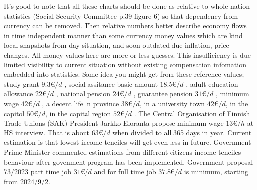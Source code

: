It's good to note that all these charts should be done
as relative to whole nation statistics
(Social Security Committee \cite{VN_2023_26} p.39 figure 6)
so that dependency from currency can be removed.
Then relative numbers better describe economy flows in time independent manner
than some currency money values which are kind local snapshots from day situation,
and soon outdated due inflation, price changes.
All money values here are more or less guesses.
This insufficiency is due limited visibility to current situation
without existing compensation infomation embedded into statistics.
Some idea you might get from these reference values;
study grant $9.3\euro/d$ \cite{KELA_StudyGrant},
social assitance basic amount $18.5\euro/d$ \cite{KELA_BASIC_ASSISTANCE},
adult education allowance $22\euro/d$ \cite{AdultEducationAllowance},
national pension $24\euro/d$ \cite{KELA_NATIONAL_PENSION},
guarantee pension $31\euro/d$ \cite{GUARANTEE_PENSION},
minimum wage $42\euro/d$ \cite{KELA_WORK_REQ},
a decent life in province $38\euro/d$,
in a university town $42\euro/d$,
in the capitol $50\euro/d$,
in the capital region $52\euro/d$ \cite{THL_2023_1}.
The Central Organisation of Finnish Trade Unions (SAK) President Jarkko Eloranta
propose minimum wage $13\euro/h$ at HS interview\cite{HS_202307290200_RS}.
That is about $63\euro/d$ when divided to all 365 days in year. Current
estimation is that lowest income tenciles will get even less in future.
Government Prime Minister commented \cite{CutExplanation} estimations from
different citizens income tenciles behaviour after govenment program has
been implemented. Government proposal 73/2023\cite{HE_73/2023_vp} part time job
$31\euro/d$ and for full time job $37.8\euro/d$ is minimum, starting from
2024/9/2.

